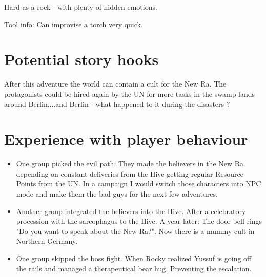 \begin{npcBox}[title=Lost: Rocky]
    \begin{stressSection}
    \end{stressSection}
    \begin{tabularx}{\textwidth}{ XX }
    \end{tabularx}

    \begin{consequences}
    \item {}
    \item {}
    \item {}
    \end{consequences}

    \begin{npcDescription}

    Hard as a rock - with plenty of hidden emotions.

    Tool info: Can improvise a torch very quick.

    \end{npcDescription}

\end{npcBox}

\newpage



\section{Potential story hooks}

After this adventure the world can contain a cult for the New Ra. The protagonists could be hired again by the UN for more tasks in the swamp lands around Berlin....and Berlin - what happened to it during the disasters ?

\section{Experience with player behaviour}

\begin{itemize}
    \item One group picked the evil path: They made the believers in the New Ra depending on constant deliveries from the Hive getting regular Resource Points from the UN. In a campaign I would switch those characters into NPC mode and make them the bad guys for the next few adventures.
    \item Another group integrated the believers into the Hive. After a celebratory procession with the sarcophagus to the Hive. A year later: The door bell rings "Do you want to speak about the New Ra?". Now there is a mummy cult in Northern Germany.
    \item One group skipped the boss fight. When Rocky realized Yussuf is going off the rails and managed a therapeutical bear hug. Preventing the escalation.
\end{itemize}


